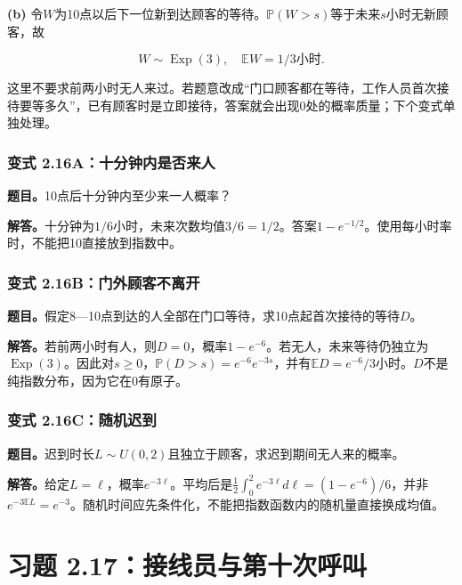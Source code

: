 \documentclass[12pt,a4paper,UTF8,fontset=fandol]{ctexart}
\begin{document}
\textbf{(b)}
令\(W\)为10点以后下一位新到达顾客的等待。\(\mathbb P(W>s)\)等于未来\(s\)小时无新顾客，故

\[\boxed{W\sim\operatorname{Exp}(3),\quad\mathbb EW=1/3\text{小时}.}\]

这里不要求前两小时无人来过。若题意改成``门口顾客都在等待，工作人员首次接待要等多久''，已有顾客时是立即接待，答案就会出现0处的概率质量；下个变式单独处理。

\subsubsection{变式
2.16A：十分钟内是否来人}\label{ux53d8ux5f0f-2.16aux5341ux5206ux949fux5185ux662fux5426ux6765ux4eba}

\textbf{题目。}10点后十分钟内至少来一人概率？

\textbf{解答。}十分钟为\(1/6\)小时，未来次数均值\(3/6=1/2\)。答案\(1-e^{-1/2}\)。使用每小时率时，不能把10直接放到指数中。

\subsubsection{变式
2.16B：门外顾客不离开}\label{ux53d8ux5f0f-2.16bux95e8ux5916ux987eux5ba2ux4e0dux79bbux5f00}

\textbf{题目。}假定8---10点到达的人全部在门口等待，求10点起首次接待的等待\(D\)。

\textbf{解答。}若前两小时有人，则\(D=0\)，概率\(1-e^{-6}\)。若无人，未来等待仍独立为\(\operatorname{Exp}(3)\)。因此对\(s\ge0\)，\(\mathbb P(D>s)=e^{-6}e^{-3s}\)，并有\(\mathbb ED=e^{-6}/3\)小时。\(D\)不是纯指数分布，因为它在0有原子。

\subsubsection{变式
2.16C：随机迟到}\label{ux53d8ux5f0f-2.16cux968fux673aux8fdfux5230}

\textbf{题目。}迟到时长\(L\sim U(0,2)\)且独立于顾客，求迟到期间无人来的概率。

\textbf{解答。}给定\(L=\ell\)，概率\(e^{-3\ell}\)。平均后是\(\frac12\int_0^2e^{-3\ell}d\ell=(1-e^{-6})/6\)，并非\(e^{-3\mathbb EL}=e^{-3}\)。随机时间应先条件化，不能把指数函数内的随机量直接换成均值。

\section{习题
2.17：接线员与第十次呼叫}\label{ux4e60ux9898-2.17ux63a5ux7ebfux5458ux4e0eux7b2cux5341ux6b21ux547cux53eb}
\end{document}
